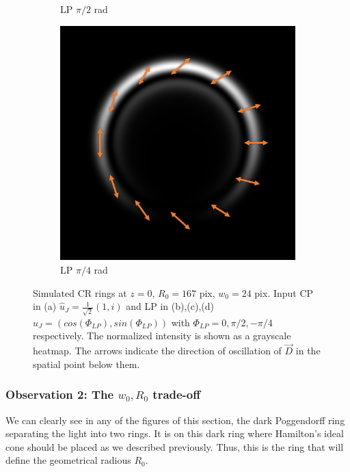 \documentclass[11pt, a4paper, twoside]{article} %
\begin{document}
\begin{figure}[h!]
\begin{subfigure}[b]{0.245\linewidth}
     \caption{LP $\pi/2$ rad}
     \end{subfigure}
  \begin{subfigure}[b]{0.245\linewidth}
     \includegraphics[width=\linewidth]{simul24.PNG}
     \caption{LP $\pi/4$ rad}
     \end{subfigure}
    \caption{Simulated CR rings at $z=0$, $R_0=167$ pix, $w_0=24$ pix. Input CP in (a) $\hat{u}_J=\frac{1}{\sqrt{2}}(1,i)$ and LP in (b),(c),(d) $\hat{u}_J=(cos(\Phi_{LP}),sin(\Phi_{LP}))$ with $\Phi_{LP}=0,\pi/2,-\pi/4$ respectively. The normalized intensity is shown as a grayscale heatmap. The arrows indicate the direction of oscillation of $\vec{D}$ in the spatial point below them.}
            \label{fig:simul2}

\end{figure}

\subsubsection*{Observation 2: The $w_0,R_0$ trade-off}
We can clearly see in any of the figures of this section, the dark Poggendorff ring separating the light into two rings. It is on this dark ring where Hamilton's ideal cone should be placed as we described previously. Thus, this is the ring that will define the geometrical radious $R_0$. 
\end{document}
